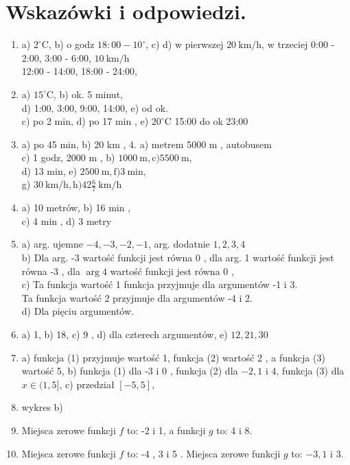 \documentclass[10pt]{article}
\begin{document}
\section*{Wskazówki i odpowiedzi.}
\begin{enumerate}
  \item a) \(2^{\circ} \mathrm{C}\), b) o godz \(18: 00-10^{\circ}\), c) d) w pierwszej \(20 \mathrm{~km} / \mathrm{h}\), w trzeciej 0:00 - 2:00, 3:00 - 6:00, \(10 \mathrm{~km} / \mathrm{h}\)\\
12:00 - 14:00, 18:00 - 24:00,
  \item a) \(15^{\circ} \mathrm{C}\), b) ok. 5 minut,\\
d) 1:00, 3:00, 9:00, 14:00, e) od ok.\\
c) po 2 min, d) po 17 min , e) \(20^{\circ} \mathrm{C}\) 15:00 do ok 23:00
  \item a) po 45 min, b) 20 km , 4. a) metrem 5000 m , autobusem\\
c) 1 godz, 2000 m , b) \(1000 \mathrm{~m}, \mathrm{c}) 5500 \mathrm{~m}\),\\
d) 13 min, e) \(2500 \mathrm{~m}, \mathrm{f}) 3 \mathrm{~min}\),\\
g) \(30 \mathrm{~km} / \mathrm{h}, \mathrm{h}) 42 \frac{6}{7} \mathrm{~km} / \mathrm{h}\)
  \item a) 10 metrów, b) 16 min ,\\
c) 4 min , d) 3 metry
  \item a) arg. ujemne \(-4,-3,-2,-1\), arg. dodatnie \(1,2,3,4\)\\
b) Dla arg. -3 wartość funkcji jest równa 0 , dla arg. 1 wartość funkcji jest równa -3 , dla \(\arg 4\) wartość funkcji jest równa 0 ,\\
c) Ta funkcja wartość 1 funkcja przyjmuje dla argumentów -1 i 3.\\
Ta funkcja wartość 2 przyjmuje dla argumentów -4 i 2.\\
d) Dla pięciu argumentów.
  \item a) 1, b) 18, c) 9 , d) dla czterech argumentów, e) \(12,21,30\)
  \item a) funkcja (1) przyjmuje wartość 1, funkcja (2) wartość 2 , a funkcja (3) wartość 5, b) funkcja (1) dla -3 i 0 , funkcja (2) dla \(-2,1\) i 4, funkcja (3) dla \(x \in(1,5]\), c) przedział \([-5,5]\),
  \item wykres b)
  \item Miejsca zerowe funkcji \(f\) to: -2 i 1, a funkcji \(g\) to: 4 i 8.
  \item Miejsca zerowe funkcji \(f\) to: -4 , 3 i 5 . Miejsca zerowe funkcji \(g\) to: \(-3,1\) i 3.

\end{enumerate}
\end{document}
